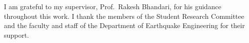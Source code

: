 I am grateful to my supervisor, Prof.\ Rakesh Bhandari, for his guidance throughout this work. I
thank the members of the Student Research Committee and the faculty and staff of the Department
of Earthquake Engineering for their support.
